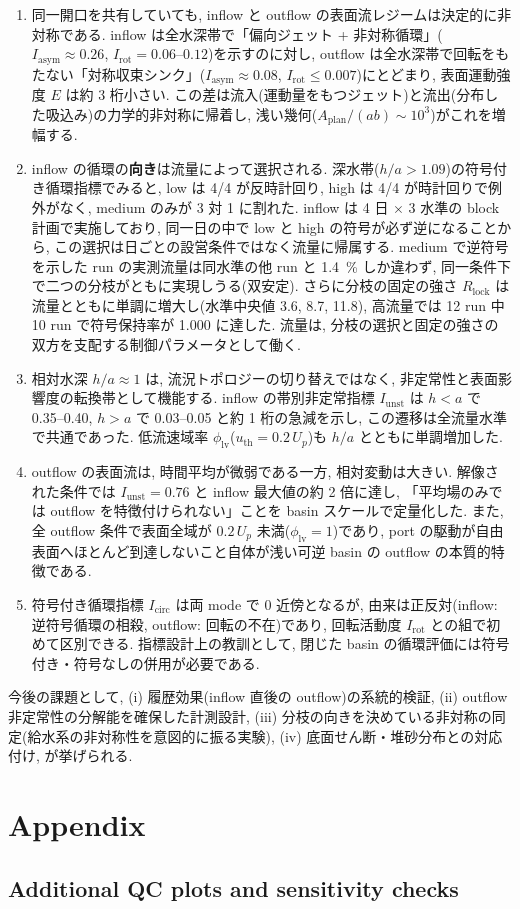 \begin{enumerate}
\item 同一開口を共有していても, inflow と outflow の表面流レジームは決定的に非対称である. inflow は全水深帯で「偏向ジェット + 非対称循環」($I_{\mathrm{asym}} \approx 0.26$, $I_{\mathrm{rot}} = 0.06$--$0.12$)を示すのに対し, outflow は全水深帯で回転をもたない「対称収束シンク」($I_{\mathrm{asym}} \approx 0.08$, $I_{\mathrm{rot}} \le 0.007$)にとどまり, 表面運動強度 $E$ は約 3 桁小さい. この差は流入(運動量をもつジェット)と流出(分布した吸込み)の力学的非対称に帰着し, 浅い幾何($A_{\mathrm{plan}}/(ab) \sim 10^3$)がこれを増幅する.

\item inflow の循環の\textbf{向き}は流量によって選択される. 深水帯($h/a>1.09$)の符号付き循環指標でみると, low は 4/4 が反時計回り, high は 4/4 が時計回りで例外がなく, medium のみが 3 対 1 に割れた. inflow は 4 日 $\times$ 3 水準の block 計画で実施しており, 同一日の中で low と high の符号が必ず逆になることから, この選択は日ごとの設営条件ではなく流量に帰属する. medium で逆符号を示した run の実測流量は同水準の他 run と \SI{1.4}{\percent} しか違わず, 同一条件下で二つの分枝がともに実現しうる(双安定). さらに分枝の固定の強さ $R_{\mathrm{lock}}$ は流量とともに単調に増大し(水準中央値 3.6, 8.7, 11.8), 高流量では 12 run 中 10 run で符号保持率が 1.000 に達した. 流量は, 分枝の選択と固定の強さの双方を支配する制御パラメータとして働く.

\item 相対水深 $h/a \approx 1$ は, 流況トポロジーの切り替えではなく, 非定常性と表面影響度の転換帯として機能する. inflow の帯別非定常指標 $I_{\mathrm{unst}}$ は $h < a$ で 0.35--0.40, $h > a$ で 0.03--0.05 と約 1 桁の急減を示し, この遷移は全流量水準で共通であった. 低流速域率 $\phi_{\mathrm{lv}}$($u_{\mathrm{th}} = 0.2\,U_p$)も $h/a$ とともに単調増加した.

\item outflow の表面流は, 時間平均が微弱である一方, 相対変動は大きい. 解像された条件では $I_{\mathrm{unst}} = 0.76$ と inflow 最大値の約 2 倍に達し, 「平均場のみでは outflow を特徴付けられない」ことを basin スケールで定量化した. また, 全 outflow 条件で表面全域が $0.2\,U_p$ 未満($\phi_{\mathrm{lv}} = 1$)であり, port の駆動が自由表面へほとんど到達しないこと自体が浅い可逆 basin の outflow の本質的特徴である.

\item 符号付き循環指標 $I_{\mathrm{circ}}$ は両 mode で 0 近傍となるが, 由来は正反対(inflow: 逆符号循環の相殺, outflow: 回転の不在)であり, 回転活動度 $I_{\mathrm{rot}}$ との組で初めて区別できる. 指標設計上の教訓として, 閉じた basin の循環評価には符号付き・符号なしの併用が必要である.
\end{enumerate}

今後の課題として, (i) 履歴効果(inflow 直後の outflow)の系統的検証, (ii) outflow 非定常性の分解能を確保した計測設計, (iii) 分枝の向きを決めている非対称の同定(給水系の非対称性を意図的に振る実験), (iv) 底面せん断・堆砂分布との対応付け, が挙げられる.

\appendix
\section{Appendix}
\subsection{Additional QC plots and sensitivity checks}
